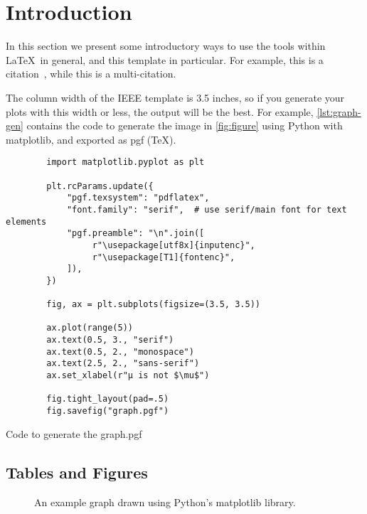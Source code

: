 
\section{Introduction}\label{sec:introduction}
In this section we present some introductory ways to use the tools within \LaTeX\ in general, and this template in particular.
For example, this is a citation~\cite{goossens1993}, while this is a multi-citation\cite{goossens1993,greenwade1993}.


The column width of the IEEE template is 3.5 inches, so if you generate your plots with this width or less, the output will be the best.
For example, \autoref{lst:graph-gen} contains the code to generate the image in \autoref{fig:figure} using Python with matplotlib, and exported as pgf (\TeX).


\begin{listing}[htb!]
    \begin{verbatim}
        import matplotlib.pyplot as plt

        plt.rcParams.update({
            "pgf.texsystem": "pdflatex",
            "font.family": "serif",  # use serif/main font for text elements
            "pgf.preamble": "\n".join([
                 r"\usepackage[utf8x]{inputenc}",
                 r"\usepackage[T1]{fontenc}",
            ]),
        })

        fig, ax = plt.subplots(figsize=(3.5, 3.5))

        ax.plot(range(5))
        ax.text(0.5, 3., "serif")
        ax.text(0.5, 2., "monospace")
        ax.text(2.5, 2., "sans-serif")
        ax.set_xlabel(r"µ is not $\mu$")

        fig.tight_layout(pad=.5)
        fig.savefig("graph.pgf")
    \end{verbatim}
    \caption{Code to generate the graph.pgf}
    \label{lst:graph-gen}
\end{listing}

\subsection{Tables and Figures}\label{subsec:tables-and-figures}


\begin{figure}[htb!]
    \centering
    
    \caption{An example graph drawn using Python's matplotlib library.}
    \label{fig:figure}
\end{figure}

